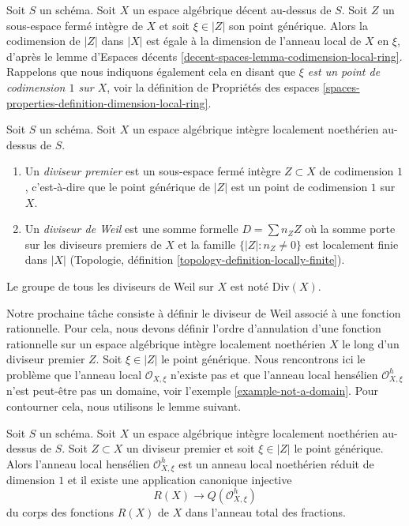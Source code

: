 \noindent
Soit $S$ un schéma. Soit $X$ un espace algébrique décent au-dessus de $S$.
Soit $Z$ un sous-espace fermé intègre de $X$ et soit
$\xi \in |Z|$ son point générique. Alors la codimension de
$|Z|$ dans $|X|$ est égale à la dimension de l'anneau local
de $X$ en $\xi$, d'après
le lemme d'Espaces décents \ref{decent-spaces-lemma-codimension-local-ring}.
Rappelons que nous indiquons également cela en disant que
{\it $\xi$ est un point de codimension $1$ sur $X$}, voir la
définition de Propriétés des espaces
\ref{spaces-properties-definition-dimension-local-ring}.

\begin{definition}
\label{definition-Weil-divisor}
Soit $S$ un schéma.
Soit $X$ un espace algébrique intègre localement noethérien au-dessus de $S$.
\begin{enumerate}
\item Un {\it diviseur premier} est un sous-espace fermé intègre $Z \subset X$
de codimension $1$, c'est-à-dire que le point générique de $|Z|$ est un point
de codimension $1$ sur $X$.
\item Un {\it diviseur de Weil} est une somme formelle $D = \sum n_Z Z$ où
la somme porte sur les diviseurs premiers de $X$ et la famille
$\{|Z| : n_Z \not = 0\}$ est localement finie dans $|X|$
(Topologie, définition \ref{topology-definition-locally-finite}).
\end{enumerate}
Le groupe de tous les diviseurs de Weil sur $X$ est noté $\text{Div}(X)$.
\end{definition}

\noindent
Notre prochaine tâche consiste à définir le diviseur de Weil associé à une fonction
rationnelle. Pour cela, nous devons définir l'ordre d'annulation d'une
fonction rationnelle sur un espace algébrique intègre localement noethérien $X$
le long d'un diviseur premier $Z$. Soit $\xi \in |Z|$ le point générique.
Nous rencontrons ici le problème que l'anneau local $\mathcal{O}_{X, \xi}$
n'existe pas et que l'anneau local hensélien $\mathcal{O}_{X, \xi}^h$
n'est peut-être pas un domaine, voir l'exemple \ref{example-not-a-domain}.
Pour contourner cela, nous utilisons le lemme suivant.

\begin{lemma}
\label{lemma-order-vanishing}
Soit $S$ un schéma. Soit $X$ un espace algébrique intègre localement noethérien
au-dessus de $S$. Soit $Z \subset X$ un diviseur premier et soit $\xi \in |Z|$
le point générique. Alors l'anneau local hensélien $\mathcal{O}_{X, \xi}^h$
est un anneau local noethérien réduit de dimension $1$ et
il existe une application canonique injective
$$
R(X) \longrightarrow Q(\mathcal{O}_{X, \xi}^h)
$$
du corps des fonctions $R(X)$ de $X$ dans l'anneau total des fractions.
\end{lemma}

